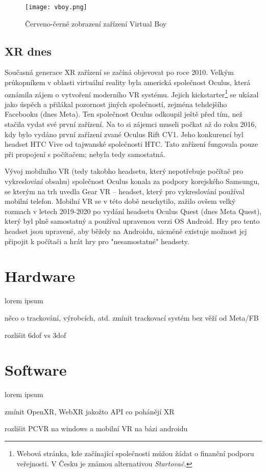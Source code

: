 \begin{figure}[H]
        \centering
        \texttt{[image: vboy.png]}
        \caption{Červeno-černé zobrazení zařízení Virtual Boy \cite{vboy}}
        \label{vboy_red_display}
\end{figure}

\section{XR dnes}

Současná generace XR zařízení se začíná objevovat po roce 2010. Velkým průkopníkem v oblasti virtuální reality byla americká společnost Oculus, která oznámila zájem o vytvoření moderního VR systému. Jejich kickstarter\footnote{Webová stránka, kde začínající společnosti můžou žádat o finanční podporu veřejnosti. V Česku je známou alternativou \em Startovač.} se ukázal jako úspěch a přilákal pozornost jiných společností, zejména tehdejšího Facebooku (dnes Meta). Ten společnost Oculus odkoupil ještě před tím, než stačila vydat své první zařízení. Na to si zájemci museli počkat až do roku 2016, kdy bylo vydáno první zařízení zvané Oculus Rift CV1. Jeho konkurencí byl headset HTC Vive od tajwanské společnosti HTC. Tato zařízení fungovala pouze při propojení s počítačem; nebyla tedy samostatná. \cite{otechnice_3}

Vývoj mobilního VR (tedy takobho headsetu, který nepotřebuje počítač pro vykreslování obsahu) společnost Oculus konala za podpory korejského Samsungu, se kterým na trh uvedla Gear VR -- headset, který pro vykreslování používal mobilní telefon. Mobilní VR se v této době neuchytilo, zažilo ovšem velký rozmach v letech 2019-2020 po vydání headsetu Oculus Quest (dnes Meta Quest), který byl plně samostatný a používal upravenou verzi OS Android. Hry pro tento headset jsou upravené, aby běžely na Androidu, nicméně existuje možnost jej připojit k počítači a hrát hry pro "nesamostatné" headsety.

\chapter{Hardware}
lorem ipsum

něco o trackování, výrobcích, atd. zmínit trackovací systém bez věží od Meta/FB

rozlišit 6dof vs 3dof

\chapter{Software}
lorem ipsum

zmínit OpenXR, WebXR jakožto API co pohánějí XR

rozlišit PCVR na windows a mobilní VR na bázi androidu